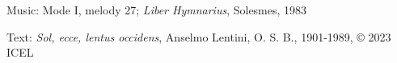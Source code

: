 

\begin{hymnsource}
Music: Mode I, melody 27; \emph{Liber Hymnarius}, Solesmes, 1983

Text: \emph{Sol, ecce, lentus occidens}, Anselmo Lentini, O. S. B., 1901-1989, © 2023 ICEL
\end{hymnsource}
